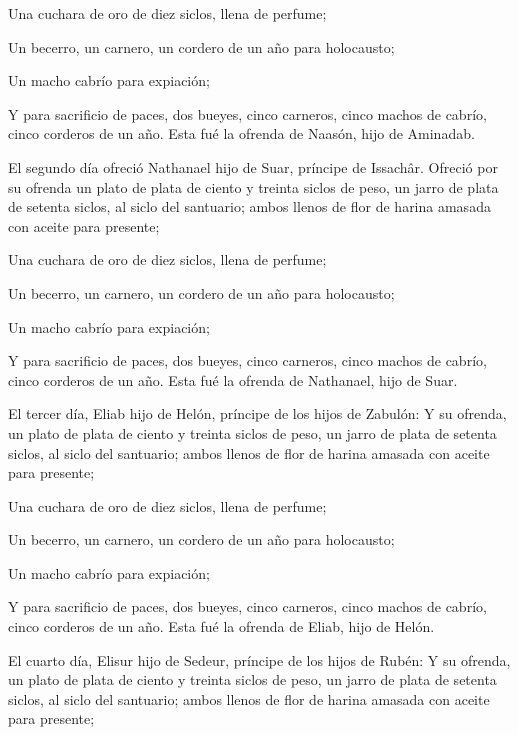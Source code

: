  Una cuchara de oro de diez siclos, llena de perfume;

 Un becerro, un carnero, un cordero de un año para
holocausto;

 Un macho cabrío para expiación;

 Y para sacrificio de paces, dos bueyes, cinco carneros,
cinco machos de cabrío, cinco corderos de un año. Esta fué la ofrenda de
Naasón, hijo de Aminadab.

 El segundo día ofreció Nathanael hijo de Suar, príncipe
de Issachâr.  Ofreció por su ofrenda un plato de plata de
ciento y treinta siclos de peso, un jarro de plata de setenta siclos, al
siclo del santuario; ambos llenos de flor de harina amasada con aceite
para presente;

 Una cuchara de oro de diez siclos, llena de perfume;

 Un becerro, un carnero, un cordero de un año para
holocausto;

 Un macho cabrío para expiación;

 Y para sacrificio de paces, dos bueyes, cinco carneros,
cinco machos de cabrío, cinco corderos de un año. Esta fué la ofrenda de
Nathanael, hijo de Suar.

 El tercer día, Eliab hijo de Helón, príncipe de los
hijos de Zabulón:  Y su ofrenda, un plato de plata de
ciento y treinta siclos de peso, un jarro de plata de setenta siclos, al
siclo del santuario; ambos llenos de flor de harina amasada con aceite
para presente;

 Una cuchara de oro de diez siclos, llena de perfume;

 Un becerro, un carnero, un cordero de un año para
holocausto;

 Un macho cabrío para expiación;

 Y para sacrificio de paces, dos bueyes, cinco carneros,
cinco machos de cabrío, cinco corderos de un año. Esta fué la ofrenda de
Eliab, hijo de Helón.

 El cuarto día, Elisur hijo de Sedeur, príncipe de los
hijos de Rubén:  Y su ofrenda, un plato de plata de
ciento y treinta siclos de peso, un jarro de plata de setenta siclos, al
siclo del santuario; ambos llenos de flor de harina amasada con aceite
para presente;

